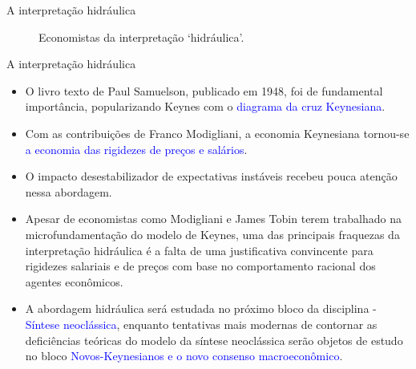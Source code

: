 \documentclass[10pt]{beamer}
\begin{document}
\begin{frame}{A interpretação hidráulica}
    \begin{figure}
        \centering
         \quad
        \caption{Economistas da interpretação `hidráulica'.}
        \label{fig4}
    \end{figure}
\end{frame}

\begin{frame}{A interpretação hidráulica}
    \begin{itemize}
        \item O livro texto de Paul Samuelson, publicado em 1948, foi de fundamental importância, popularizando Keynes com o \textcolor{blue}{diagrama da cruz Keynesiana}.
        \bigskip
        \item Com as contribuições de Franco Modigliani, a economia Keynesiana tornou-se \textcolor{blue}{a economia das rigidezes de preços e salários}.
        \bigskip
        \item O impacto desestabilizador de expectativas instáveis recebeu pouca atenção nessa abordagem.
        \bigskip
        \item Apesar de economistas como Modigliani e James Tobin terem trabalhado na microfundamentação do modelo de Keynes, uma das principais fraquezas da interpretação hidráulica é a falta de uma justificativa convincente para rigidezes salariais e de preços com base no comportamento racional dos agentes econômicos.
        \bigskip
        \item A abordagem hidráulica será estudada no próximo bloco da disciplina - \textcolor{blue}{Síntese neoclássica}, enquanto tentativas mais modernas de contornar as deficiências teóricas do modelo da síntese neoclássica serão objetos de estudo no bloco \textcolor{blue}{Novos-Keynesianos e o novo consenso macroeconômico}.
    \end{itemize}
\end{frame}
\end{document}
